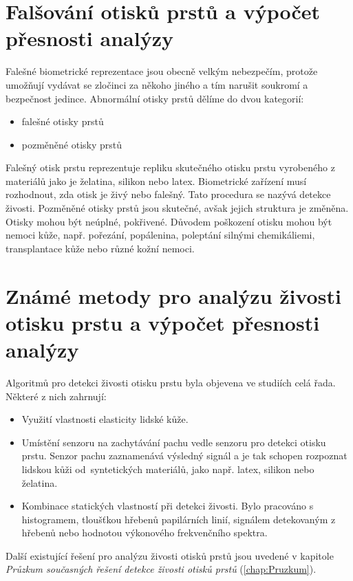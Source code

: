 \section{Falšování otisků prstů a výpočet přesnosti analýzy}
Falešné biometrické reprezentace jsou obecně velkým nebezpečím, protože umožňují vydávat se zločinci za někoho jiného a tím narušit soukromí a bezpečnost jedince. Abnormální otisky prstů dělíme do dvou kategorií:
\begin{itemize}
    \item falešné otisky prstů
    \item pozměněné otisky prstů
\end{itemize}
Falešný otisk prstu reprezentuje repliku skutečného otisku prstu vyrobeného z materiálů jako je želatina, silikon nebo latex. Biometrické zařízení musí rozhodnout, zda otisk je živý nebo falešný. Tato procedura se nazývá detekce živosti.
Pozměněné otisky prstů jsou skutečné, avšak jejich struktura je změněna. Otisky mohou být neúplné, pokřivené. Důvodem poškození otisku mohou být nemoci kůže, např. pořezání, popálenina, poleptání silnými chemikáliemi, transplantace kůže nebo různé kožní nemoci. \cite{Petrovici}
\section{Známé metody pro analýzu živosti otisku prstu a výpočet přesnosti analýzy}
Algoritmů pro detekci živosti otisku prstu byla objevena ve studiích celá řada. Některé z nich zahrnují: \cite{AbhiskekStudy}
\begin{itemize}
    \item Využití vlastnosti elasticity lidské kůže.
    \item Umístění senzoru na zachytávání pachu vedle senzoru pro detekci otisku prstu. Senzor pachu zaznamenává výsledný signál a je tak schopen rozpoznat lidskou kůži od~syntetických materiálů, jako např. latex, silikon nebo želatina.
    \item Kombinace statických vlastností při detekci živosti. Bylo pracováno s histogramem, tloušťkou hřebenů papilárních linií, signálem detekovaným z hřebenů nebo hodnotou výkonového frekvenčního spektra.
    
\end{itemize}

Další existující řešení pro analýzu živosti otisků prstů jsou uvedené v kapitole \textit{Průzkum současných řešení detekce živosti otisků prstů} (\autoref{chap:Pruzkum}).


